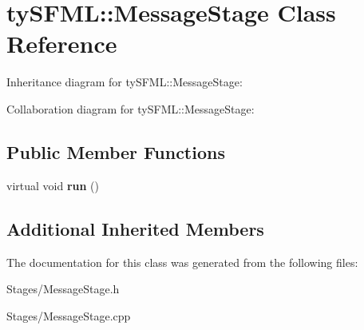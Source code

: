 \hypertarget{classty_s_f_m_l_1_1_message_stage}{}\section{ty\+S\+F\+M\+L\+:\+:Message\+Stage Class Reference}
\label{classty_s_f_m_l_1_1_message_stage}


Inheritance diagram for ty\+S\+F\+M\+L\+:\+:Message\+Stage\+:


Collaboration diagram for ty\+S\+F\+M\+L\+:\+:Message\+Stage\+:
\subsection*{Public Member Functions}
\begin{DoxyCompactItemize}
\item 
\hypertarget{classty_s_f_m_l_1_1_message_stage_a665fd61c66397769db75cdb588b4a2a2}{}virtual void {\bfseries run} ()\label{classty_s_f_m_l_1_1_message_stage_a665fd61c66397769db75cdb588b4a2a2}

\end{DoxyCompactItemize}
\subsection*{Additional Inherited Members}


The documentation for this class was generated from the following files\+:\begin{DoxyCompactItemize}
\item 
Stages/Message\+Stage.\+h\item 
Stages/Message\+Stage.\+cpp\end{DoxyCompactItemize}
